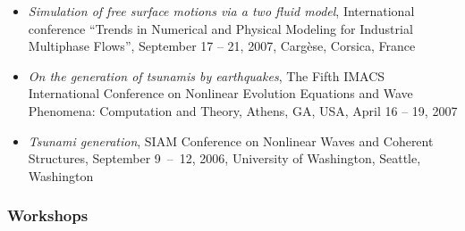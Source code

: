 \documentclass[final, a4paper, oneside, 12pt]{article}
\numberwithin{equation}{section}
\begin{document}
\begin{itemize}
  \item \textit{Simulation of free surface motions via a two fluid model}, International conference ``Trends in Numerical and Physical Modeling for Industrial Multiphase Flows'', September 17 -- 21, 2007, Carg\`ese, Corsica, France
  
  \item \textit{On the generation of tsunamis by earthquakes}, The Fifth IMACS International Conference on Nonlinear Evolution Equations and Wave Phenomena: Computation and Theory, Athens, GA, USA, April 16 -- 19, 2007
  
  \item \textit{Tsunami generation}, SIAM Conference on Nonlinear Waves and Coherent Structures, September 9~--~12, 2006, University of Washington, Seattle, Washington
  
\end{itemize}

\subsubsection{Workshops}
\end{document}
